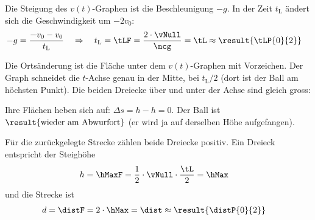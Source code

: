 \begin{abcliste}
\abc Die Steigung des $v(t)$-Graphen ist die Beschleunigung $-g$. In der Zeit $t_\mathrm{L}$ ändert sich die Geschwindigkeit um $-2v_0$:
\begin{align}
 -g &= \frac{-v_0-v_0}{t_\mathrm{L}} \quad\Rightarrow\quad t_\mathrm{L} = \tLF = \frac{2\cdot\vNull}{\ncg} = \tL \approx \result{\tLP{0}{2}}
\end{align}

\abc Die Ortsänderung ist die Fläche unter dem $v(t)$-Graphen mit Vorzeichen. Der Graph schneidet die $t$-Achse genau in der Mitte, bei $t_\mathrm{L}/2$ (dort ist der Ball am höchsten Punkt). Die beiden Dreiecke über und unter der Achse sind gleich gross:
\begin{center}
\end{center}
Ihre Flächen heben sich auf: $\Delta s = h - h = 0$. Der Ball ist $\result{\text{wieder am Abwurfort}}$ (er wird ja auf derselben Höhe aufgefangen).

\abc Für die zurückgelegte Strecke zählen beide Dreiecke positiv. Ein Dreieck entspricht der Steighöhe
\begin{align}
 h &= \hMaxF = \frac{1}{2}\cdot\vNull\cdot\frac{\tL}{2} = \hMax
\end{align}
und die Strecke ist
\begin{align}
 d &= \distF = 2\cdot\hMax = \dist \approx \result{\distP{0}{2}}
\end{align}
\end{abcliste}
